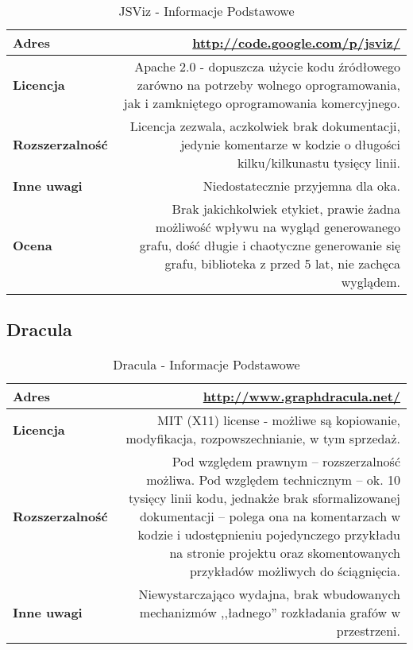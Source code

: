 \begin{table}[H]
\begin{tabularx}{\textwidth}{ ||l|R|| }
\hline
\textbf{Adres} & \url{http://code.google.com/p/jsviz/} \\
\hline
\textbf{Licencja} & Apache 2.0 - dopuszcza użycie kodu źródłowego zarówno na potrzeby wolnego oprogramowania, jak i zamkniętego oprogramowania komercyjnego. \\
\hline

\textbf{Rozszerzalność} & Licencja zezwala, aczkolwiek brak dokumentacji, jedynie komentarze w kodzie o długości kilku/kilkunastu tysięcy linii. \\
\hline

\textbf{Inne uwagi} & Niedostatecznie przyjemna dla oka. \\
\hline

\textbf{Ocena} & Brak jakichkolwiek etykiet, prawie żadna możliwość wpływu na wygląd generowanego grafu, dość długie i chaotyczne generowanie się grafu, biblioteka z przed 5 lat, nie zachęca wyglądem. \\
\hline
\end{tabularx}
\caption{JSViz - Informacje Podstawowe}
\end{table}


\vfill
\subsection{Dracula}

\begin{table}[H]
\begin{tabularx}{\textwidth}{ ||l|R|| }
\hline
\textbf{Adres} & \url{http://www.graphdracula.net/} \\
\hline
\textbf{Licencja} & MIT (X11) license - możliwe są kopiowanie, modyfikacja, rozpowszechnianie, w tym sprzedaż. \\
\hline

\textbf{Rozszerzalność} & Pod względem prawnym -- rozszerzalność możliwa. Pod względem technicznym -- ok. 10 tysięcy linii kodu, jednakże brak sformalizowanej dokumentacji -- polega ona na komentarzach w kodzie i udostępnieniu pojedynczego przykładu na stronie projektu oraz skomentowanych przykładów możliwych do ściągnięcia. \\
\hline

\textbf{Inne uwagi} & Niewystarczająco wydajna, brak wbudowanych mechanizmów ,,ładnego'' rozkładania grafów w przestrzeni. \\
\hline

\end{tabularx}
\caption{Dracula - Informacje Podstawowe}
\end{table}




